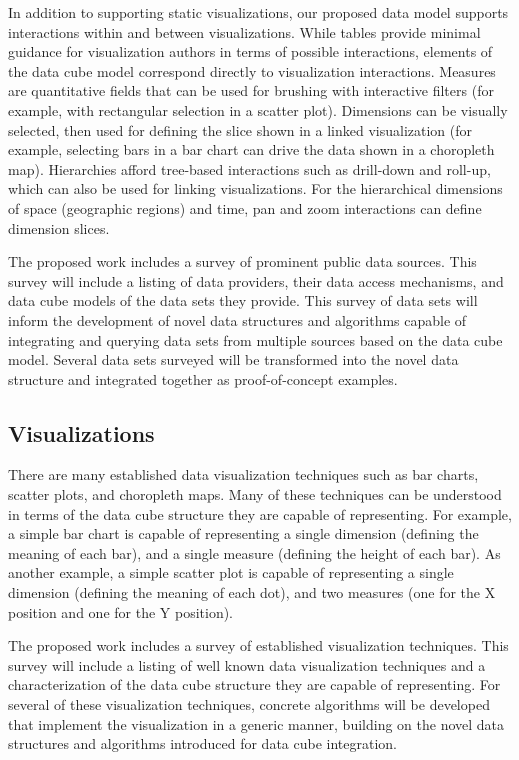 \documentclass[12pt]{article}
\begin{document}
\begin{doublespace}
In addition to supporting static visualizations, our proposed data model supports interactions within and between visualizations. While tables provide minimal guidance for visualization authors in terms of possible interactions, elements of the data cube model correspond directly to visualization interactions. Measures are quantitative fields that can be used for brushing with interactive filters (for example, with rectangular selection in a scatter plot). Dimensions can be visually selected, then used for defining the slice shown in a linked visualization (for example, selecting bars in a bar chart can drive the data shown in a choropleth map). Hierarchies afford tree-based interactions such as drill-down and roll-up, which can also be used for linking visualizations. For the hierarchical dimensions of space (geographic regions) and time, pan and zoom interactions can define dimension slices.

The proposed work includes a survey of prominent public data sources. This survey will include a listing of data providers, their data access mechanisms, and data cube models of the data sets they provide. This survey of data sets will inform the development of novel data structures and algorithms capable of integrating and querying data sets from multiple sources based on the data cube model. Several data sets surveyed will be transformed into the novel data structure and integrated together as proof-of-concept examples.

\subsection{Visualizations}
There are many established data visualization techniques such as bar charts, scatter plots, and choropleth maps. Many of these techniques can be understood in terms of the data cube structure they are capable of representing. For example, a simple bar chart is capable of representing a single dimension (defining the meaning of each bar), and a single measure (defining the height of each bar). As another example, a simple scatter plot is capable of representing a single dimension (defining the meaning of each dot), and two measures (one for the X position and one for the Y position).

The proposed work includes a survey of established visualization techniques. This survey will include a listing of well known data visualization techniques and a characterization of the data cube structure they are capable of representing. For several of these visualization techniques, concrete algorithms will be developed that implement the visualization in a generic manner, building on the novel data structures and algorithms introduced for data cube integration.


\end{doublespace}
\end{document}
